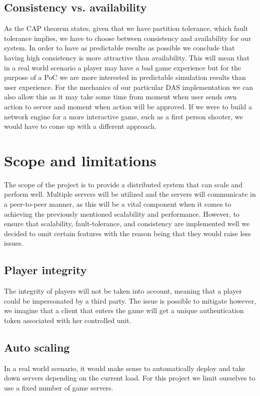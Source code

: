 \documentclass[a4paper]{article}
\begin{document}
\subsection{Consistency vs. availability}
As the CAP theorem states, given that we have partition tolerance, which fault tolerance implies, we have to choose between consistency and availability for our system. In order to have as predictable results as possible we conclude that having high consistency is more attractive than availability. This will mean that in a real world scenario a player may have a bad game experience but for the purpose of a PoC we are more interested in predictable simulation results than user experience. For the mechanics of our particular DAS implementation we can also allow this as it may take some time from moment when user sends own action to server and moment when action will be approved. If we were to build a network engine for a more interactive game, such as a first person shooter, we would have to come up with a different approach.

\section{Scope and limitations}
The scope of the project is to provide a distributed system that can scale and perform well. Multiple servers will be utilized and the servers will communicate in a peer-to-peer manner, as this will be a vital component when it comes to achieving the previously mentioned scalability and performance. However, to ensure that scalability, fault-tolerance, and consistency are implemented well we decided to omit certain features with the reason being that they would raise less issues.

\subsection{Player integrity}
The integrity of players will not be taken into account, meaning that a player could be impersonated by a third party. The issue is possible to mitigate however, we imagine that a client that enters the game will get a unique authentication token associated with her controlled unit. 

\subsection{Auto scaling}
In a real world scenario, it would make sense to automatically deploy and take down servers depending on the current load. For this project we limit ourselves to use a fixed number of game servers. 
\end{document}
